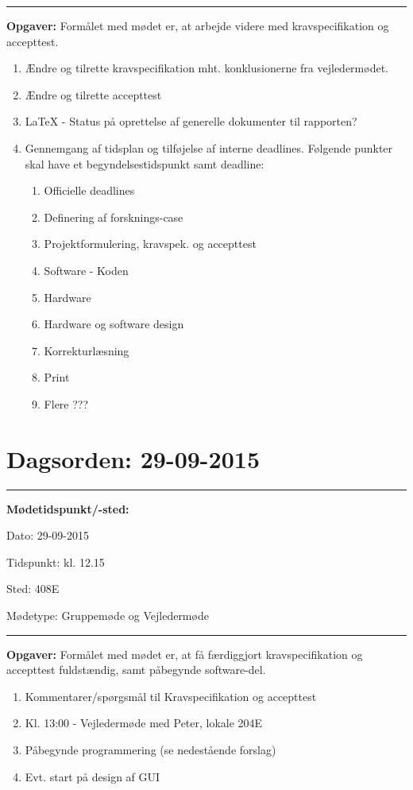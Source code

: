 \hrule
\textbf{Opgaver:} \newline
Formålet med mødet er, at arbejde videre med kravspecifikation og accepttest.
\begin{enumerate}
\item Ændre og tilrette kravspecifikation mht. konklusionerne fra vejledermødet.

\item Ændre og tilrette accepttest

\item LaTeX - Status på oprettelse af generelle dokumenter til rapporten?

\item Gennemgang af tidsplan og tilføjelse af interne deadlines. Følgende punkter skal have et begyndelsestidspunkt samt deadline:
\begin{enumerate}
\item Officielle deadlines
\item Definering af forsknings-case
\item Projektformulering, kravspek. og accepttest
\item Software - Koden
\item Hardware
\item Hardware og software design
\item Korrekturlæsning
\item Print
\item Flere ???

\end{enumerate}
\end{enumerate}

\newpage
\section{Dagsorden: 29-09-2015}
\hrule



\textbf{Mødetidspunkt/-sted:} 

Dato: \tabto{7em} 29-09-2015

Tidspunkt: \tabto{7em} kl. 12.15

Sted: \tabto{7em} 408E

Mødetype: \tabto{7em} Gruppemøde og Vejledermøde \newline


\hrule
\textbf{Opgaver:} \newline
Formålet med mødet er, at få færdiggjort kravspecifikation og accepttest fuldstændig, samt påbegynde software-del.
\begin{enumerate}
\item Kommentarer/spørgsmål til Kravspecifikation og accepttest

\item Kl. 13:00 - Vejledermøde med Peter, lokale 204E

\item Påbegynde programmering (se nedestående forslag)

\item Evt. start på design af GUI
\end{enumerate}

